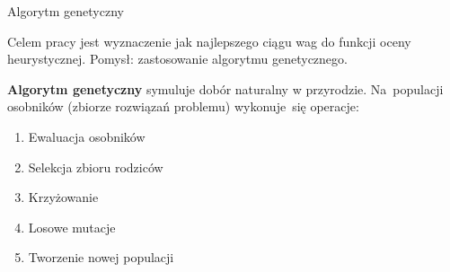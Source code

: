 \begin{frame}{Algorytm genetyczny}

	\begin{itemize}
		\myitem Celem pracy jest wyznaczenie jak najlepszego ciągu wag do funkcji oceny heurystycznej.
		\myitem Pomysł: zastosowanie algorytmu genetycznego.
	\end{itemize}
	
	\hspace{1cm}

	\textbf{Algorytm genetyczny} symuluje dobór naturalny w przyrodzie. Na~populacji osobników (zbiorze rozwiązań problemu) wykonuje~się operacje:
	\begin{enumerate}
		\item Ewaluacja osobników
		\item Selekcja zbioru rodziców
		\item Krzyżowanie 
		\item Losowe mutacje
		\item Tworzenie nowej populacji
	\end{enumerate}
	
			
			
					
						
							
							
							
							

\end{frame}
